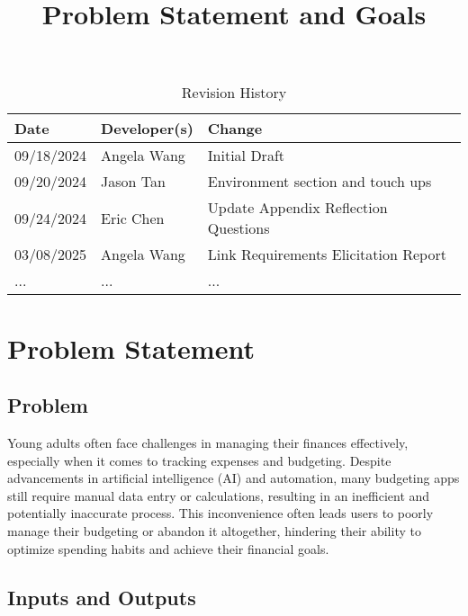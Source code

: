 \documentclass{article}
\title{Problem Statement and Goals\\\progname}
\author{\authname}
\date{}
\begin{document}
\maketitle

\begin{table}[hp]
\caption{Revision History} \label{TblRevisionHistory}
\begin{tabularx}{\textwidth}{llX}
\toprule
\textbf{Date} & \textbf{Developer(s)} & \textbf{Change}\\
\midrule
09/18/2024 & Angela Wang & Initial Draft\\
09/20/2024 & Jason Tan & Environment section and touch ups\\
09/24/2024 & Eric Chen & Update Appendix Reflection Questions\\
03/08/2025 & Angela Wang & Link Requirements Elicitation Report\\
... & ... & ...\\
\bottomrule
\end{tabularx}
\end{table}

\section{Problem Statement}



\subsection{Problem}

Young adults often face challenges in managing their finances effectively,
especially when it comes to tracking expenses and budgeting. Despite
advancements in artificial intelligence (AI) and automation, many budgeting apps
still require manual data entry or calculations, resulting in an inefficient and
potentially inaccurate process. This inconvenience often leads users to poorly
manage their budgeting or abandon it altogether, hindering their ability to
optimize spending habits and achieve their financial goals.


\subsection{Inputs and Outputs}
\end{document}
